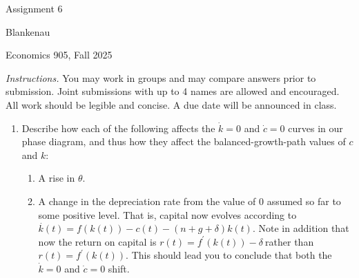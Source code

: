 \documentclass{article}
\begin{document}
\begin{center}
{\LARGE Assignment 6}
\end{center}

\noindent Blankenau

\noindent Economics 905, Fall 2025\medskip

\noindent \noindent \textit{Instructions.} You may work in groups and may
compare answers prior to submission. Joint submissions with up to 4 names
are allowed and encouraged. All work should be legible and concise. A due
date will be announced in class.

\begin{enumerate}
\item Describe how each of the following affects the $\dot{k}=0$ and $\dot{c}%
=0$ curves in our phase diagram, and thus how they affect the
balanced-growth-path values of $c$ and $k$:

\begin{enumerate}
\item A rise in $\theta .$

\item A change in the depreciation rate from the value of 0 assumed so far
to some positive level. That is, capital now evolves according to $\overset{.%
}{k}\left( t\right) =f\left( k\left( t\right) \right) -c\left( t\right)
-\left( n+g+\delta \right) k\left( t\right) .$ Note in addition that now the
return on capital is $r\left( t\right) =f^{\prime }\left( k\left( t\right)
\right) -\delta \ $rather than $r\left( t\right) =f^{\prime }\left( k\left(
t\right) \right) .$ This should lead you to conclude that both the $\dot{k}%
=0 $ and $\dot{c}=0$ shift.
\end{enumerate}


\end{enumerate}
\end{document}
